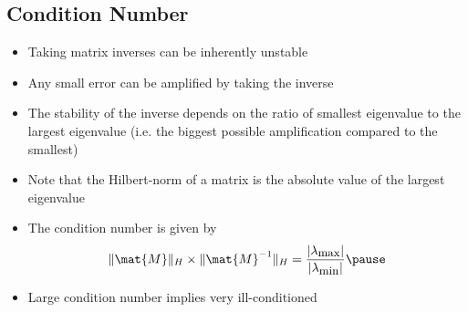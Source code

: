 
\begin{slide}
\section[-2]{Condition Number}

\begin{PauseHighLight}
  \begin{itemize}\squeeze
  \item Taking matrix inverses can be inherently unstable\pause
  \item Any small error can be amplified by taking the inverse\pause
  \item The stability of the inverse depends on the ratio of smallest
    eigenvalue to the largest eigenvalue (i.e. the biggest possible
    amplification compared to the smallest)\pause
  \item Note that the Hilbert-norm of a matrix is the absolute value of
    the largest eigenvalue\pause
  \item The condition number is given by
    \begin{align*}
      \|\mat{M}\|_H \times \|\mat{M}^{-1}\|_H =
      \frac{|\lambda_{\text{\small max}}|}{|\lambda_{\text{\small min}}|}\pause
    \end{align*}
  \item Large condition number implies very ill-conditioned\pause
  \end{itemize}
\end{PauseHighLight}

\end{slide}

\Outline %

